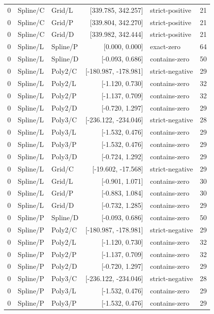 \begin{longtable}{lllrlr}
0 & Spline/C & Grid/L & [339.785, 342.257] & strict-positive & 21 \\
0 & Spline/C & Grid/P & [339.804, 342.270] & strict-positive & 21 \\
0 & Spline/C & Grid/D & [339.982, 342.444] & strict-positive & 21 \\
0 & Spline/L & Spline/P & [0.000, 0.000] & exact-zero & 64 \\
0 & Spline/L & Spline/D & [-0.093, 0.686] & contains-zero & 50 \\
0 & Spline/L & Poly2/C & [-180.987, -178.981] & strict-negative & 29 \\
0 & Spline/L & Poly2/L & [-1.120, 0.730] & contains-zero & 32 \\
0 & Spline/L & Poly2/P & [-1.137, 0.709] & contains-zero & 32 \\
0 & Spline/L & Poly2/D & [-0.720, 1.297] & contains-zero & 29 \\
0 & Spline/L & Poly3/C & [-236.122, -234.046] & strict-negative & 28 \\
0 & Spline/L & Poly3/L & [-1.532, 0.476] & contains-zero & 29 \\
0 & Spline/L & Poly3/P & [-1.532, 0.476] & contains-zero & 29 \\
0 & Spline/L & Poly3/D & [-0.724, 1.292] & contains-zero & 29 \\
0 & Spline/L & Grid/C & [-19.602, -17.568] & strict-negative & 29 \\
0 & Spline/L & Grid/L & [-0.901, 1.071] & contains-zero & 30 \\
0 & Spline/L & Grid/P & [-0.883, 1.084] & contains-zero & 30 \\
0 & Spline/L & Grid/D & [-0.732, 1.285] & contains-zero & 29 \\
0 & Spline/P & Spline/D & [-0.093, 0.686] & contains-zero & 50 \\
0 & Spline/P & Poly2/C & [-180.987, -178.981] & strict-negative & 29 \\
0 & Spline/P & Poly2/L & [-1.120, 0.730] & contains-zero & 32 \\
0 & Spline/P & Poly2/P & [-1.137, 0.709] & contains-zero & 32 \\
0 & Spline/P & Poly2/D & [-0.720, 1.297] & contains-zero & 29 \\
0 & Spline/P & Poly3/C & [-236.122, -234.046] & strict-negative & 28 \\
0 & Spline/P & Poly3/L & [-1.532, 0.476] & contains-zero & 29 \\
0 & Spline/P & Poly3/P & [-1.532, 0.476] & contains-zero & 29 \\

\end{longtable}
